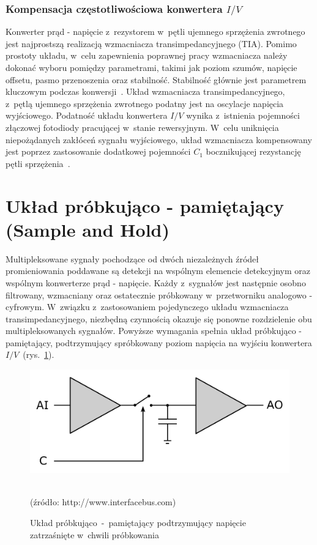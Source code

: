 \subsubsection{Kompensacja częstotliwościowa konwertera $I/V$ }
\label{subsubsec:kompensacja}

Konwerter prąd - napięcie z~rezystorem w~pętli ujemnego sprzężenia zwrotnego jest najprostszą realizacją wzmacniacza transimpedancyjnego (TIA). Pomimo prostoty układu, w~celu zapewnienia poprawnej
pracy wzmacniacza należy dokonać wyboru pomiędzy parametrami, takimi jak poziom szumów, napięcie offsetu, pasmo przenoszenia oraz stabilność. Stabilność głównie jest parametrem kluczowym podczas 
konwersji~\cite{Bhat:2012}.
Układ wzmacniacza transimpedancyjnego, z~pętlą ujemnego sprzężenia zwrotnego podatny jest na oscylacje napięcia wyjściowego. Podatność układu konwertera $I/V$ wynika z~istnienia pojemności
złączowej fotodiody pracującej w~stanie rewersyjnym. W~celu uniknięcia niepożądanych zakłóceń sygnału wyjściowego, układ wzmacniacza kompensowany jest poprzez zastosowanie dodatkowej pojemności $C_{1}$
bocznikującej rezystancję pętli sprzężenia~\cite{Rako}.


\section{Układ próbkująco - pamiętający (Sample and Hold)}
\label{sec:SampleHold}

Multipleksowane sygnały pochodzące od dwóch niezależnych źródeł promieniowania poddawane są detekcji na wspólnym elemencie detekcyjnym oraz wspólnym konwerterze prąd - napięcie. Każdy z~sygnałów jest następnie osobno filtrowany, 
wzmacniany oraz ostatecznie próbkowany w~przetworniku analogowo - cyfrowym. W~związku z~zastosowaniem pojedynczego układu wzmacniacza transimpedancyjnego, niezbędną czynnością okazuje się ponowne
rozdzielenie obu multipleksowanych sygnałów. 
Powyższe wymagania spełnia układ próbkująco - pamiętający, podtrzymujący spróbkowany poziom napięcia na wyjściu konwertera $I/V$~(rys.~\ref{rys:SampleHold}). 

\begin{figure}[ht]
	\centerline{\includegraphics[scale = 0.3]{graphic/SampleHold}}
	\caption{Układ próbkująco~-~pamiętający podtrzymujący napięcie zatrzaśnięte w~chwili próbkowania}
	~\\
	(źródło: http://www.interfacebus.com)
	\label{rys:SampleHold}
\end{figure}

